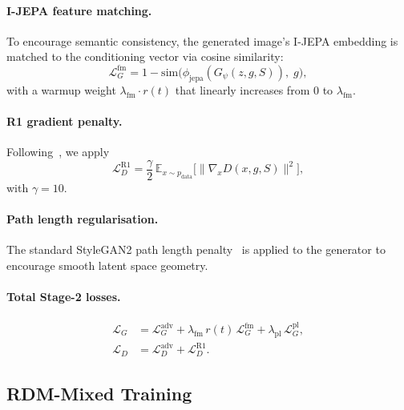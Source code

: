 \documentclass[12pt]{article}
\begin{document}
\paragraph{I-JEPA feature matching.}
To encourage semantic consistency, the generated image's I-JEPA
embedding is matched to the conditioning vector via cosine similarity:
\begin{equation}\label{eq:fm-loss}
    \mathcal{L}_G^{\mathrm{fm}}
    = 1 - \mathrm{sim}\!\bigl(
    \phi_{\mathrm{jepa}}(G_\psi(z, g, S)),\; g
    \bigr),
\end{equation}
with a warmup weight $\lambda_{\mathrm{fm}} \cdot r(t)$ that linearly
increases from $0$ to $\lambda_{\mathrm{fm}}$.

\paragraph{R1 gradient penalty.}
Following~\cite{mescheder2018training}, we apply
\begin{equation}\label{eq:r1}
    \mathcal{L}_D^{\mathrm{R1}}
    = \frac{\gamma}{2}\,
    \mathbb{E}_{x \sim p_{\mathrm{data}}}\!\bigl[
    \lVert \nabla_x D(x, g, S) \rVert^2 \bigr],
\end{equation}
with $\gamma = 10$.

\paragraph{Path length regularisation.}
The standard StyleGAN2 path length penalty~\cite{karras2020stylegan2}
is applied to the generator to encourage smooth latent space geometry.

\paragraph{Total Stage-2 losses.}
\begin{align}
    \mathcal{L}_G &= \mathcal{L}_G^{\mathrm{adv}}
    + \lambda_{\mathrm{fm}}\, r(t)\, \mathcal{L}_G^{\mathrm{fm}}
    + \lambda_{\mathrm{pl}}\, \mathcal{L}_G^{\mathrm{pl}},
    \label{eq:total-g-loss} \\
    \mathcal{L}_D &= \mathcal{L}_D^{\mathrm{adv}}
    + \mathcal{L}_D^{\mathrm{R1}}.
    \label{eq:total-d-loss}
\end{align}

\subsection{RDM-Mixed Training}
\label{sec:rdm-mixed}
\end{document}

